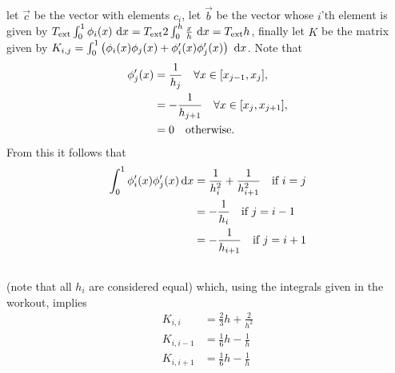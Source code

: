 \subsection{}
let $\vec c$ be the vector with elements $c_i$, let $\vec b$ be the vector whose $i$'th element is given by $T_\text{ext}\int_0^1\phi_i(x)\,\,\text{d}x = T_\text{ext}2\int_0^h\frac{x}{h}\,\,\text{d}x=T_\text{ext}h$, finally let $K$ be the matrix given by
$K_{i,j} = \int_0^1  \left(\phi_i(x)\phi_j(x) + \phi_i'(x)\phi_j'(x)\right)\,\,\text{d}x$.
Note that
\begin{align}
 \phi_j'(x) &= \frac{1}{h_j}\quad\forall x \in [x_{j-1}, x_j],\\\nonumber
            &= -\frac{1}{h_{j+1}}\quad\forall x \in [x_{j}, x_{j+1}],\\\nonumber
 &= 0\quad\text{otherwise.}
\end{align}
From this it follows that
\begin{align}
 \int_0^1 \phi_i'(x)\phi_j'(x)\,\text{d}x &= \frac{1}{h_i^2}+\frac{1}{h_{i+1}^2} \quad\text{if }i=j\\\nonumber
 &=-\frac{1}{h_i}\quad\text{if }j = i-1\\\nonumber
 &=-\frac{1}{h_{i+1}}\quad\text{if }j = i+1\\\nonumber
\end{align}
(note that all $h_i$ are considered equal) which, using the integrals given in the workout, implies
\begin{align}
K_{i,i} &= \frac{2}{3}h+\frac{2}{h^2}\\
K_{i,i-1} &= \frac{1}{6}h-\frac{1}{h}\\
K_{i,i+1} &= \frac{1}{6}h-\frac{1}{h}
\end{align}



